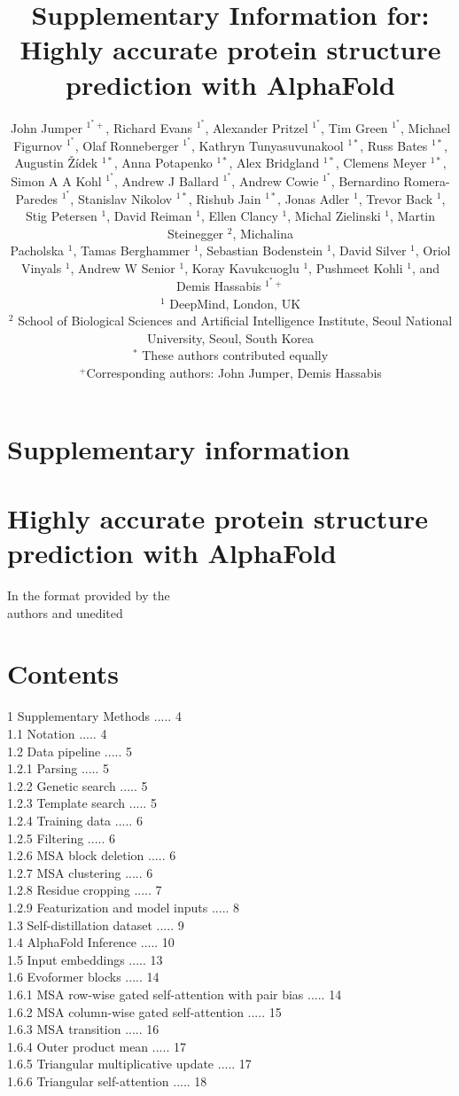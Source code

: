 \documentclass[10pt]{article}
\title{Supplementary Information for: Highly accurate protein structure prediction with AlphaFold }
\author{John Jumper ${ }^{1^{*}+}$, Richard Evans ${ }^{1^{*}}$, Alexander Pritzel ${ }^{1^{*}}$, Tim Green ${ }^{1^{*}}$, Michael Figurnov ${ }^{1^{*}}$, Olaf Ronneberger ${ }^{1^{*}}$, Kathryn Tunyasuvunakool ${ }^{1 *}$, Russ Bates ${ }^{1 *}$, Augustin Žídek ${ }^{1 *}$, Anna Potapenko ${ }^{1 *}$, Alex Bridgland ${ }^{1 *}$, Clemens Meyer ${ }^{1 *}$, Simon A A Kohl ${ }^{1^{*}}$, Andrew J Ballard ${ }^{1^{*}}$, Andrew Cowie ${ }^{1^{*}}$, Bernardino Romera-Paredes ${ }^{1^{*}}$, Stanislav Nikolov ${ }^{1 *}$, Rishub Jain ${ }^{1 *}$, Jonas Adler ${ }^{1}$, Trevor Back ${ }^{1}$, Stig Petersen ${ }^{1}$, David Reiman ${ }^{1}$, Ellen Clancy ${ }^{1}$, Michal Zielinski ${ }^{1}$, Martin Steinegger ${ }^{2}$, Michalina\\
Pacholska ${ }^{1}$, Tamas Berghammer ${ }^{1}$, Sebastian Bodenstein ${ }^{1}$, David Silver ${ }^{1}$, Oriol Vinyals ${ }^{1}$, Andrew W Senior ${ }^{1}$, Koray Kavukcuoglu ${ }^{1}$, Pushmeet Kohli ${ }^{1}$, and Demis Hassabis ${ }^{1^{*}+}$\\
${ }^{1}$ DeepMind, London, UK\\
${ }^{2}$ School of Biological Sciences and Artificial Intelligence Institute, Seoul National University, Seoul, South Korea\\
${ }^{*}$ These authors contributed equally\\
${ }^{+}$Corresponding authors: John Jumper, Demis Hassabis}
\date{}
\begin{document}
\maketitle
\captionsetup{singlelinecheck=false}
\section*{Supplementary information}
\section*{Highly accurate protein structure prediction with AlphaFold}
In the format provided by the\\
authors and unedited



\section*{Contents}
1 Supplementary Methods ..... 4\\
1.1 Notation ..... 4\\
1.2 Data pipeline ..... 5\\
1.2.1 Parsing ..... 5\\
1.2.2 Genetic search ..... 5\\
1.2.3 Template search ..... 5\\
1.2.4 Training data ..... 6\\
1.2.5 Filtering ..... 6\\
1.2.6 MSA block deletion ..... 6\\
1.2.7 MSA clustering ..... 6\\
1.2.8 Residue cropping ..... 7\\
1.2.9 Featurization and model inputs ..... 8\\
1.3 Self-distillation dataset ..... 9\\
1.4 AlphaFold Inference ..... 10\\
1.5 Input embeddings ..... 13\\
1.6 Evoformer blocks ..... 14\\
1.6.1 MSA row-wise gated self-attention with pair bias ..... 14\\
1.6.2 MSA column-wise gated self-attention ..... 15\\
1.6.3 MSA transition ..... 16\\
1.6.4 Outer product mean ..... 17\\
1.6.5 Triangular multiplicative update ..... 17\\
1.6.6 Triangular self-attention ..... 18\\
\end{document}
